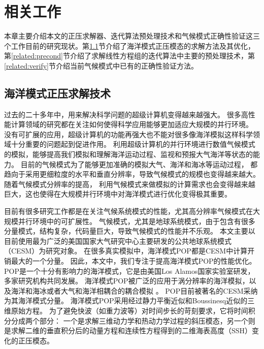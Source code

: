 \chapter{相关工作}
\label{cha:related}
本章主要介绍本文的正压求解器、迭代算法预处理技术和气候模式正确性验证这三个工作目前的研究现状。第\ref{solver:Backgroud}节介绍了海洋模式正压模态的求解方法及其优化，第\ref{related:precond}节介绍了求解线性方程组的迭代算法中主要的预处理技术，第\ref{related:verify}节介绍当前气候模式中已有的正确性验证方法。


\section{海洋模式正压求解技术}
\label{solver:Backgroud} 

过去的二十多年中，用来解决科学问题的超级计算机变得越来越强大。 
很多高性能计算领域的研究都在关注如何使得科学应用能够更加适应大规模的并行环境\cite{hu2013scalable}。 
没有可扩展的应用，超级计算机的功能再强大也不能对很多像海洋模拟这样科学领域十分重要的问题起到促进作用。 
利用超级计算机的并行环境进行数值气候模式的模拟，能够提高我们模拟和理解海洋运动过程、监视和预报大气海洋等状态的能力。
目前的气候模式为了能够更加准确的模拟大气、海洋和海冰等运动过程， 都趋向于采用更细粒度的水平和垂直分辨率，导致气候模式的规模也变得越来越大。 
随着气候模式分辨率的提高， 利用气候模式来做模拟的计算需求也会变得越来越巨大，这也使得在大规模并行环境中对海洋模式进行优化变得极其重要。 



目前有很多研究工作都是在关注气候系统模式的性能，尤其高分辨率气候模式在大规模并行环境中的可扩展性。 
气候模式，尤其是地球系统模式，由于包含有很多分量模式，结构复杂，代码量巨大，导致气候模式的性能并不乐观。 
本文主要以目前使用最为广泛的美国国家大气研究中心主要研发的公共地球系统模式（CESM）为研究对象。
在很多真实模拟中，海洋模式POP都是CESM中计算开销最大的一个分量\cite{Worley:2011:PCE:2063384.2063457, dennis2012computational}。 
因此，本文中，我们专注于提高海洋模式POP的性能优化。 
POP是一个十分有影响力的海洋模式，它是由美国Los Alamos国家实验室研发，多家研究机构共同发展。
海洋模式POP被广泛的应用于涡分辨率的海洋模拟\cite{mcclean2002eulerian, stark2004towards}，以及海洋和海冰或者大气和海洋相耦合的耦合模拟  \cite{May2002preliminary}。 
POP目前被著名的CESM采纳为其海洋模式分量。  
海洋模式POP采用经过静力平衡近似和Boussinesq近似的三维原始方程。 
为了避免快波（如重力波等）对时间步长的苛刻要求，它将时间积分分成两个部分： 一个是求解三维动力学和热动力学过程的斜压模态，另一个则是求解二维的垂直积分后的动量方程和连续性方程得到的二维海表高度（SSH）变化的正压模态\cite{smith2010parallel}。

